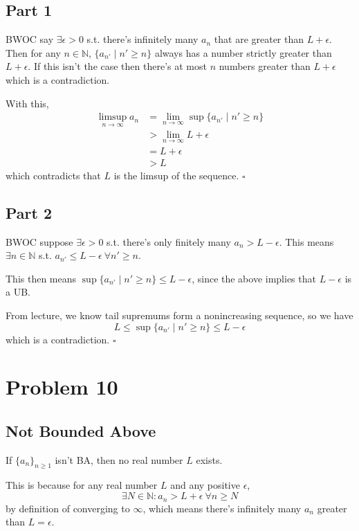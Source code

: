 \documentclass[12pt]{article}
\newcommand{\N}{\mathbb{N}}
\begin{document}
\subsection{Part 1}\label{sec:prob9p1}

BWOC say $\exists \epsilon > 0$ s.t. there's infinitely many $a_n$ that are greater than $L+\epsilon$.
Then for any $n \in \N$, $\{a_{n'} \mid n' \ge n\}$ always has a number strictly greater than $L+\epsilon$.
If this isn't the case then there's at most $n$ numbers greater than $L+\epsilon$ which is a contradiction.

With this,
\begin{align*}
  \limsup_{n \to \infty} a_n
   & = \lim_{n \to \infty} \sup \{a_{n'} \mid n' \ge n\} \\
   & > \lim_{n \to \infty} L+\epsilon                    \\
   & = L+\epsilon                                        \\
   & > L
\end{align*}
which contradicts that $L$ is the limsup of the sequence. $\square$

\subsection{Part 2}\label{sec:prob9p2}

BWOC suppose $\exists \epsilon > 0$ s.t. there's only finitely many $a_n > L-\epsilon$.
This means $\exists n \in \N$ s.t. $a_{n'} \le L-\epsilon\ \forall n' \ge n$.

This then means $\sup \{a_{n'} \mid n' \ge n\} \le L-\epsilon$,
since the above implies that $L-\epsilon$ is a UB.

From lecture, we know tail supremums form a nonincreasing sequence, so we have
\[L \le \sup \{a_{n'} \mid n' \ge n\} \le L-\epsilon\]
which is a contradiction. $\square$

\pagebreak

\section{Problem 10}

\subsection{Not Bounded Above}

If $\{a_n\}_{n \ge 1}$ isn't BA, then no real number $L$ exists.

This is because for any real number $L$ and any positive $\epsilon$,
\[\exists N \in \N: a_n > L+\epsilon\ \forall n \ge N\]
by definition of converging to $\infty$, which means there's infinitely many $a_n$ greater than $L=\epsilon$.
\end{document}

